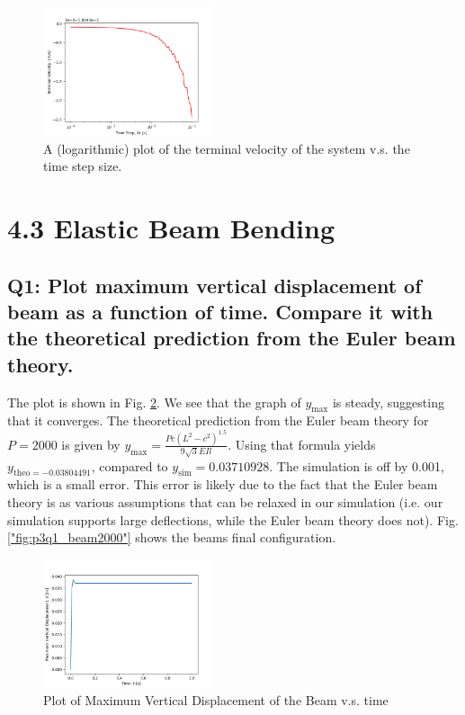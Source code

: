 \documentclass[letterpaper, 10 pt, conference]{ieeeconf}  %
\begin{document}
\begin{figure}[!ht]
        \centering
        \includegraphics[width=0.45\textwidth,keepaspectratio]{p2q3_implicit_vterm_vs_dt.png}
        \caption{A (logarithmic) plot of the terminal velocity of the system v.s. the time step size.}
        \label{"fig:p2q3_temporal"}
\end{figure}


\section{4.3 Elastic Beam Bending}

\subsection*{Q1: Plot maximum vertical displacement of beam as a function of time. Compare it with the theoretical prediction from the Euler beam theory.}

The plot is shown in Fig. \ref{"fig:p3q1_max_vert"}. We see that the graph of  $y_{\text{max}}$ is steady, suggesting that it converges. The theoretical prediction from the Euler beam theory for $P = 2000$ is given by $y_{\text{max}} = \frac{Pc(L^2-c^2)^1.5}{9\sqrt{3} E I l}$. Using that formula yields $y_{\text{theo} = -0.03804491}$, compared to $y_\text{sim}=0.03710928$. The simulation is off by 0.001, which is a small error. This error is likely due to the fact that the Euler beam theory is as various assumptions that can be relaxed in our simulation (i.e. our simulation supports large deflections, while the Euler beam theory does not). Fig. \ref{"fig:p3q1_beam2000"} shows the beams final configuration.

\begin{figure}[!ht]
        \centering
        \includegraphics[width=0.45\textwidth,keepaspectratio]{p3q1_implicit_fallingBeam.png}
        \caption{Plot of Maximum Vertical Displacement of the Beam v.s. time}
        \label{"fig:p3q1_max_vert"}
\end{figure}
\end{document}
